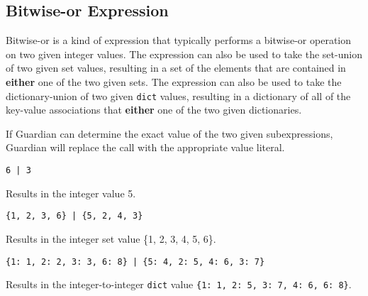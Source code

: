 
\subsection{Bitwise-or Expression}
{
	Bitwise-or is a kind of expression that typically performs
	a bitwise-or operation on two given integer values.
	The expression can also be used to take the set-union
	of two given set values, resulting in a set of the
	elements that are contained in
	\textbf{either} one of the two given sets.
	The expression can also be used to take the
	dictionary-union of two given
	\texttt{dict} values, resulting in a dictionary of
	all of the key-value
	associations that \textbf{either} one of the two given
	dictionaries.
	
	If Guardian can determine the exact value of the two given subexpressions,
	Guardian will replace the call with the appropriate value literal.
	
	\begin{itemize}
	{
		\item \texttt{6 | 3}
		
			Results in the integer value 5.
		
		\item \texttt{\{1, 2, 3, 6\} | \{5, 2, 4, 3\}}
		
			Results in the integer set value \{1, 2, 3, 4, 5, 6\}.
		
		\item \texttt{\{1: 1, 2: 2, 3: 3, 6: 8\} | \{5: 4, 2: 5, 4: 6, 3: 7\}}
		
			Results in the integer-to-integer \texttt{dict}
			value \texttt{\{1: 1, 2: 5, 3: 7, 4: 6, 6: 8\}}.
	}
	\end{itemize}
}
